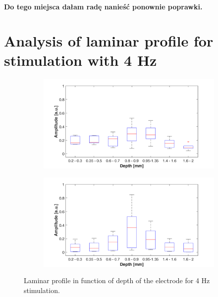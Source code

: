 \documentclass{pracalicmgr}
\begin{document}
	\textbf{Do tego miejsca dałam radę nanieść ponownie poprawki.}
\newpage  
  
\section{Analysis of laminar profile for stimulation with 4 Hz} 
   	\begin{figure}[H]
	\begin{subfigure}{.5\textwidth}
		\centering
		\includegraphics[width=1.\linewidth]{profile_4Hz_wid.png}
		\caption{}
		\label{rys:profil_4Hz_wid1}
	\end{subfigure}%
	\begin{subfigure}{.5\textwidth}
		\centering
		\includegraphics[width=1.\linewidth]{profile_4Hz_wid2.png}
		\caption{}
		\label{rys:profil_4Hz_wid2}
	\end{subfigure}

	
	\caption{Laminar profile in function of depth of the electrode for 4 Hz stimulation.}
	\label{rys:profil_4Hz_wid}
\end{figure}
\end{document}
